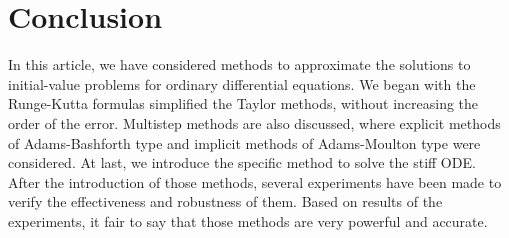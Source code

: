 \documentclass[preprint,12pt]{elsarticle}
\begin{document}
\section{Conclusion}
\label{S:4}

In this article, we have considered methods to approximate the solutions to initial-value problems for ordinary differential equations. We began with the Runge-Kutta formulas simplified the Taylor methods, without increasing the order of the error. Multistep methods are also discussed, where explicit methods of Adams-Bashforth type and implicit methods of Adams-Moulton type were considered. At last, we introduce the specific method to solve the stiff ODE. After the introduction of those methods, several experiments have been made to verify the effectiveness and robustness of them. Based on results of the experiments, it fair to say that those methods are very powerful and accurate.

\nocite{burden:2011na}













\end{document}
